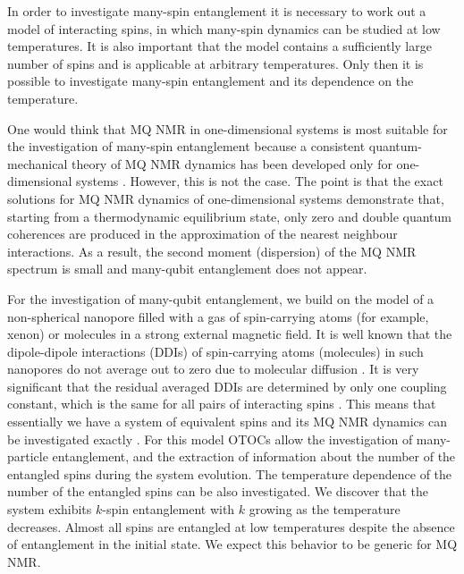 \documentclass[
    pra,  
    twocolumn, 
    floatfix, 
    amsmath, 
    amssymb, 
    superscriptaddress
]{revtex4-1}
\begin{document}
\par
In order to investigate many-spin entanglement it is necessary to work out a model of interacting spins, in which many-spin dynamics can be studied at low temperatures. 
It is also important that the model contains a sufficiently large number of spins and is applicable at arbitrary temperatures.
Only then it is possible to investigate many-spin entanglement and its dependence on the temperature.
\par
One would think that MQ NMR in one-dimensional systems is most suitable for the investigation of many-spin entanglement because a consistent quantum-mechanical theory of MQ NMR dynamics has been developed only for one-dimensional systems \cite{lab:nmr_dyn_1996,lab:mq_nmr_in_chain_1997,lab:mq_dyn_of_chain_in_solid_2000}. However, this is not the case. The point is that the exact solutions for MQ NMR dynamics of one-dimensional systems demonstrate \cite{lab:nmr_dyn_1996,lab:mq_nmr_in_chain_1997,lab:mq_dyn_of_chain_in_solid_2000} that, starting from a thermodynamic equilibrium state, only zero and double quantum coherences are produced in the approximation of the nearest neighbour interactions. As a result, the second moment (dispersion) of the MQ NMR spectrum is small and many-qubit entanglement does not appear.
\par
For the investigation of many-qubit entanglement, we build on the model \cite{nanopore_model} of a non-spherical nanopore filled with a gas of spin-carrying atoms (for example, xenon) or molecules in a strong external magnetic field. 
It is well known that the dipole-dipole interactions (DDIs) of spin-carrying atoms (molecules) in such nanopores do not average out to zero due to molecular diffusion \cite{nanopore_model,lab:depolar_in_nanocavities_2004}. 
It is very significant that the residual averaged DDIs are determined by only one coupling constant, which is the same for all pairs of interacting spins \cite{nanopore_model,lab:depolar_in_nanocavities_2004}. 
This means that essentially we have a system of equivalent spins and its MQ NMR dynamics can be investigated exactly \cite{lab:mq_nmr_dyn_in_nanopores_2009}.
For this model OTOCs allow the investigation of many-particle entanglement, and the extraction of information about the number of the entangled spins during the system evolution. 
The temperature dependence of the number of the entangled spins can be also investigated.
We discover that the system exhibits $k$-spin entanglement with $k$ growing as the temperature decreases. 
Almost all spins are entangled at low temperatures despite the absence of  entanglement in the initial state. We expect this behavior to be generic for MQ NMR.
\end{document}
